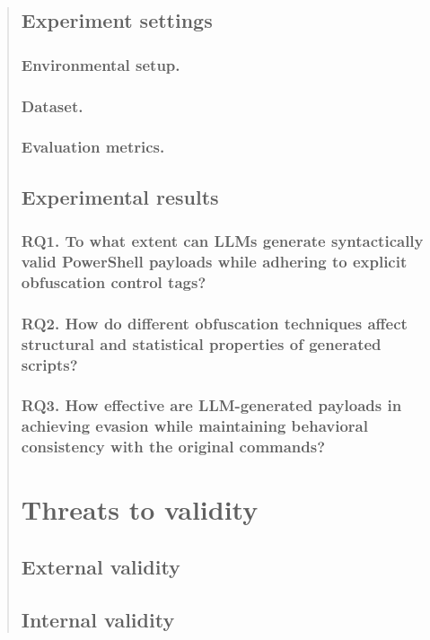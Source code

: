 \documentclass[runningheads]{llncs}
\begin{document}
\begin{abstract}
\subsection{Experiment settings}
\subsubsection{Environmental setup.}

\subsubsection{Dataset.}

\subsubsection{Evaluation metrics.}


\subsection{Experimental results}
\subsubsection{RQ1. To what extent can LLMs generate syntactically valid PowerShell payloads while adhering to explicit obfuscation control tags?}


\subsubsection{RQ2. How do different obfuscation techniques affect structural and statistical properties of generated scripts?}


\subsubsection{RQ3. How effective are LLM-generated payloads in achieving evasion while maintaining behavioral consistency with the original commands?}


\section{Threats to validity}
\subsection{External validity}


\subsection{Internal validity}



\end{abstract}
\end{document}
